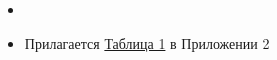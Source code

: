 \begin{itemize}
    \item {}
    \item Прилагается \hyperlink{table1}{Таблица 1} в Приложении 2
\end{itemize}
